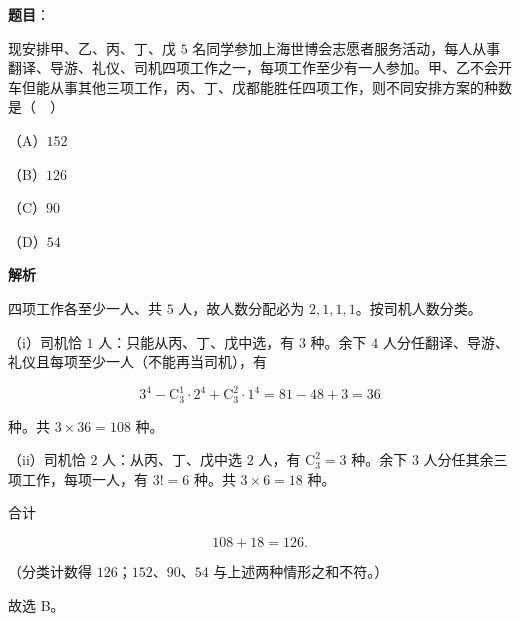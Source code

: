 \begin{answer}

\textbf{题目}：

现安排甲、乙、丙、丁、戊 $5$ 名同学参加上海世博会志愿者服务活动，每人从事翻译、导游、礼仪、司机四项工作之一，每项工作至少有一人参加。甲、乙不会开车但能从事其他三项工作，丙、丁、戊都能胜任四项工作，则不同安排方案的种数是（　）

（A）$152$

（B）$126$

（C）$90$

（D）$54$

\textbf{解析}

四项工作各至少一人、共 $5$ 人，故人数分配必为 $2,1,1,1$。按司机人数分类。

（i）司机恰 $1$ 人：只能从丙、丁、戊中选，有 $3$ 种。余下 $4$ 人分任翻译、导游、礼仪且每项至少一人（不能再当司机），有

\nopagebreak[4]
\[3^4-\mathrm C_3^1\cdot2^4+\mathrm C_3^2\cdot1^4=81-48+3=36\]

种。共 $3\times36=108$ 种。

（ii）司机恰 $2$ 人：从丙、丁、戊中选 $2$ 人，有 $\mathrm C_3^2=3$ 种。余下 $3$ 人分任其余三项工作，每项一人，有 $3!=6$ 种。共 $3\times6=18$ 种。

合计

\nopagebreak[4]
\[108+18=126.\]

（分类计数得 $126$；$152$、$90$、$54$ 与上述两种情形之和不符。）

故选 B。


\end{answer}
